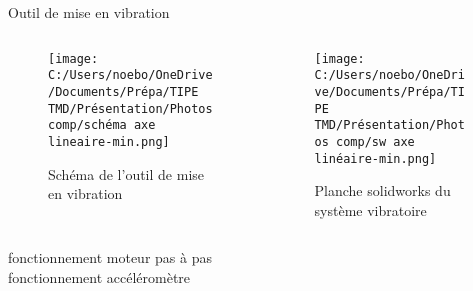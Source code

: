 \documentclass{beamer}
\begin{document}
\begin{frame}{Outil de mise en vibration}

	\begin{columns}
		\begin{column}{0.5\textwidth}
			\begin{figure}
				\texttt{[image: C:/Users/noebo/OneDrive/Documents/Prépa/TIPE TMD/Présentation/Photos comp/schéma axe lineaire-min.png]}
				\caption{Schéma de l'outil de mise en vibration}
			\end{figure}
		\end{column}
		\begin{column}{0.5\textwidth}
			\begin{figure}
				\texttt{[image: C:/Users/noebo/OneDrive/Documents/Prépa/TIPE TMD/Présentation/Photos comp/sw axe linéaire-min.png]}
				\caption{Planche solidworks du système vibratoire}
			\end{figure}
		\end{column}
	\end{columns}
\end{frame}

		\begin{frame}
			fonctionnement moteur pas à pas\\
			fonctionnement accéléromètre 
			
		\end{frame}
\end{document}
